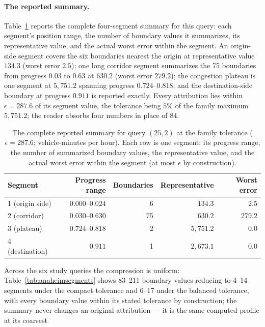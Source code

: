 \paragraph{The reported summary.}
Table~\ref{tab:anaheimsegmentsfull} reports the complete four-segment
summary for this query: each segment's position range, the number of
boundary values it summarizes, its representative value, and the actual
worst error within the segment. An origin-side segment covers the six
boundaries nearest the origin at representative value $134.3$ (worst
error $2.5$); one long corridor segment summarizes the 75 boundaries
from progress $0.03$ to $0.63$ at $630.2$ (worst error $279.2$); the
congestion plateau is one segment at $5{,}751.2$ spanning progress
$0.724$--$0.818$; and the destination-side boundary at progress
$0.911$ is reported exactly. Every attribution lies within
$\epsilon=287.6$ of its segment value, the tolerance being $5\%$ of
the family maximum $5{,}751.2$; the reader absorbs four numbers in
place of $84$.
\begin{table}[t]\centering\footnotesize
\caption{The complete reported summary for query $(25,2)$ at the
family tolerance ($\epsilon=287.6$; vehicle-minutes per hour). Each row
is one segment: its progress range, the number of summarized boundary
values, the representative value, and the actual worst error within the
segment (at most $\epsilon$ by construction).}\label{tab:anaheimsegmentsfull}
\setlength{\tabcolsep}{5pt}
\begin{tabular*}{\tblwidth}{@{\extracolsep{\fill}}lrrrr}
\toprule
Segment & Progress range & Boundaries & Representative & Worst error\\
\midrule
1 (origin side) & $0.000$--$0.024$ & 6 & $134.3$ & $2.5$\\
2 (corridor) & $0.030$--$0.630$ & 75 & $630.2$ & $279.2$\\
3 (plateau) & $0.724$--$0.818$ & 2 & $5{,}751.2$ & $0.0$\\
4 (destination) & $0.911$ & 1 & $2{,}673.1$ & $0.0$\\
\bottomrule\end{tabular*}\end{table}
Across the six study queries the compression is uniform:
Table~\ref{tab:anaheimsegments} shows 83--211 boundary values reducing
to 4--14 segments under the compact tolerance and 6--17 under the
balanced tolerance, with every boundary value within its stated
tolerance by construction; the summary never changes an original
attribution --- it is the same computed profile at its coarsest

